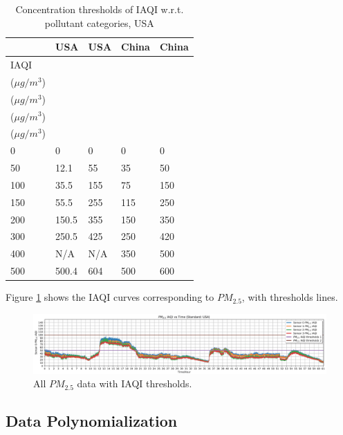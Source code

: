 \documentclass[sigconf]{acmart}
\begin{document}
\begin{table}[!htbp]
    \centering
    \caption{Concentration thresholds of IAQI w.r.t. pollutant categories, USA}
    \label{table:IAQI_thresholds}
    \begin{tabular}{l|l|l|l|l}
        \hline
        \hline
        \  & USA & USA & China & China \\ \hline
        IAQI & \makecell[c]{$PM_{2.5}$ \\ ($\mu g/m^3$)} & \makecell[c]{$PM_{10}$ \\ ($\mu g/m^3$)} & \makecell[c]{$PM_{2.5}$ \\ ($\mu g/m^3$)} & \makecell[c]{$PM_{10}$ \\ ($\mu g/m^3$)} \\ \hline
        0    & 0     & 0   & 0   & 0   \\ \hline
        50   & 12.1  & 55  & 35  & 50  \\ \hline
        100  & 35.5  & 155 & 75  & 150 \\ \hline
        150  & 55.5  & 255 & 115 & 250 \\ \hline
        200  & 150.5 & 355 & 150 & 350 \\ \hline
        300  & 250.5 & 425 & 250 & 420 \\ \hline
        400  & N/A   & N/A & 350 & 500 \\ \hline
        500  & 500.4 & 604 & 500 & 600 \\ \hline
        \hline
    \end{tabular}
\end{table}

Figure \ref{fig:pm25_all_iaqi_with_thresholds} shows the IAQI curves corresponding to $PM_{2.5}$, with thresholds lines.

\begin{figure}[!htbp]
    \begin{center}
        \includegraphics[width=0.8\linewidth]{fig/data/iaqi/pm25_all_iaqi_with_thresholds.png}
    \end{center}
    \caption{All $PM_{2.5}$ data with IAQI thresholds.}
    \label{fig:pm25_all_iaqi_with_thresholds}
\end{figure}

\subsection{Data Polynomialization}
\end{document}
